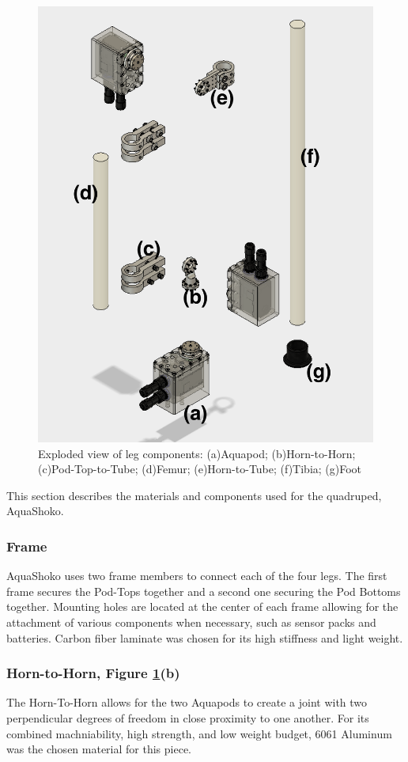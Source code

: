 \begin{figure}
\centering
\includegraphics[width=0.7\columnwidth]{./img/aquaShoko-v3dot3-exploded-leg.png}
\caption{Exploded view of leg components: (a)Aquapod; (b)Horn-to-Horn; (c)Pod-Top-to-Tube; (d)Femur; (e)Horn-to-Tube; (f)Tibia; (g)Foot}
\label{fig:leg exploded}
\end{figure}




This section describes the materials and components used for the quadruped, AquaShoko.

\subsubsection{Frame}
AquaShoko uses two frame members to connect each of the four legs. The first frame secures the Pod-Tops together and a second one securing the Pod Bottoms together. Mounting holes are located at the center of each frame allowing for the attachment of various components when necessary, such as sensor packs and batteries. Carbon fiber laminate was chosen for its high stiffness and light weight.
\subsubsection{Horn-to-Horn, Figure \ref{fig:leg exploded}(b)}
The Horn-To-Horn allows for the two Aquapods to create a joint with two perpendicular degrees of freedom in close proximity to one another. For its combined machniability, high strength, and low weight budget, 6061 Aluminum was the chosen material for this piece.

